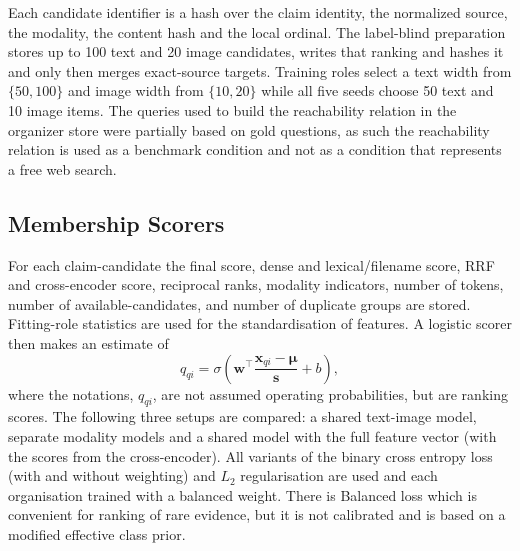 Each candidate identifier is a hash over the claim identity, the normalized source, the modality, the content hash and the local ordinal. The label-blind preparation stores up to 100 text and 20 image candidates, writes that ranking and hashes it and only then merges exact-source targets. Training roles select a text width from $\{50,100\}$ and image width from $\{10,20\}$ while all five seeds choose 50 text and 10 image items. The queries used to build the reachability relation in the organizer store were partially based on gold questions, as such the reachability relation is used as a benchmark condition and not as a condition that represents a free web search.

\subsection{Membership Scorers}

For each claim-candidate the final score, dense and lexical/filename score, RRF and cross-encoder score, reciprocal ranks, modality indicators, number of tokens, number of available-candidates, and number of duplicate groups are stored. Fitting-role statistics are used for the standardisation of features. A logistic scorer then makes an estimate of
\begin{equation}
q_{qi}=\sigma\!\left(\mathbf{w}^{\top}
\frac{\mathbf{x}_{qi}-\boldsymbol{\mu}}{\boldsymbol{s}}+b\right),
\label{eq:membership-scorer}
\end{equation}
where the notations, $q_{qi}$, are not assumed operating probabilities, but are ranking scores. The following three setups are compared: a shared text-image model, separate modality models and a shared model with the full feature vector (with the scores from the cross-encoder). All variants of the binary cross entropy loss (with and without weighting) and $L_2$ regularisation are used and each organisation trained with a balanced weight. There is Balanced loss which is convenient for ranking of rare evidence, but it is not calibrated and is based on a modified effective class prior.

